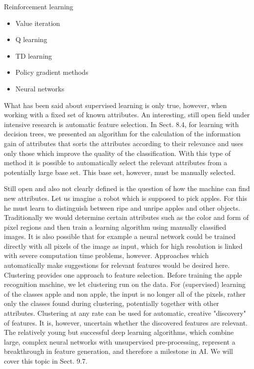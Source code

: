 \documentclass[10pt]{book}
\begin{document}
Reinforcement learning

\begin{itemize}
  \item Value iteration
  \item Q learning
  \item TD learning
  \item Policy gradient methods
  \item Neural networks
\end{itemize}

What has been said about supervised learning is only true, however, when working with a fixed set of known attributes. An interesting, still open field under intensive research is automatic feature selection. In Sect. 8.4, for learning with decision trees, we presented an algorithm for the calculation of the information gain of attributes that sorts the attributes according to their relevance and uses only those which improve the quality of the classification. With this type of method it is possible to automatically select the relevant attributes from a potentially large base set. This base set, however, must be manually selected.

Still open and also not clearly defined is the question of how the machine can find new attributes. Let us imagine a robot which is supposed to pick apples. For this he must learn to distinguish between ripe and unripe apples and other objects. Traditionally we would determine certain attributes such as the color and form of pixel regions and then train a learning algorithm using manually classified images. It is also possible that for example a neural network could be trained directly with all pixels of the image as input, which for high resolution is linked with severe computation time problems, however. Approaches which automatically make suggestions for relevant features would be desired here.
Clustering provides one approach to feature selection. Before training the apple recognition machine, we let clustering run on the data. For (supervised) learning of the classes apple and non apple, the input is no longer all of the pixels, rather only the classes found during clustering, potentially together with other attributes. Clustering at any rate can be used for automatic, creative "discovery" of features. It is, however, uncertain whether the discovered features are relevant. The relatively young but successful deep learning algorithms, which combine large, complex neural networks with unsupervised pre-processing, represent a breakthrough in feature generation, and therefore a milestone in AI. We will cover this topic in Sect. 9.7.
\end{document}

